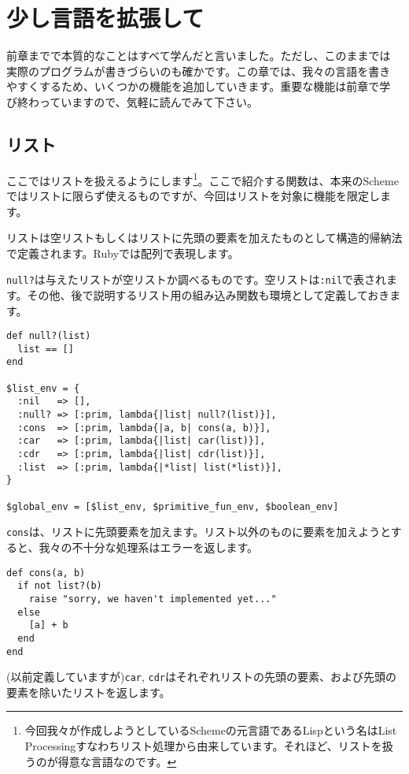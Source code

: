 \chapter{少し言語を拡張して\hspace{-3mm}}\label{chap:extend}
前章までで本質的なことはすべて学んだと言いました。ただし、このままでは
実際のプログラムが書きづらいのも確かです。この章では、我々の言語を書き
やすくするため、いくつかの機能を追加していきます。重要な機能は前章で学
び終わっていますので、気軽に読んでみて下さい。

\section{リスト}\label{sec:list}

ここではリストを扱えるようにします\footnote{今回我々が作成しようとしているSchemeの元言語であるLispという名はList Processingすなわちリスト処理から由来しています。それほど、リストを扱うのが得意な言語なのです。}。ここで紹介する関数は、本来のSchemeではリストに限らず使えるものですが、今回はリストを対象に機能を限定します。

リストは空リストもしくはリストに先頭の要素を加えたものとして構造的帰納法で定義されます。Rubyでは配列で表現します。

{\tt null?}は与えたリストが空リストか調べるものです。空リストは{\tt :nil}で表されます。その他、後で説明するリスト用の組み込み関数も環境として定義しておきます。

\begin{lstlisting}
def null?(list)
  list == []
end

$list_env = {
  :nil   => [],
  :null? => [:prim, lambda{|list| null?(list)}],
  :cons  => [:prim, lambda{|a, b| cons(a, b)}],
  :car   => [:prim, lambda{|list| car(list)}],
  :cdr   => [:prim, lambda{|list| cdr(list)}],
  :list  => [:prim, lambda{|*list| list(*list)}],
}

$global_env = [$list_env, $primitive_fun_env, $boolean_env]
\end{lstlisting}

{\tt cons}は、リストに先頭要素を加えます。リスト以外のものに要素を加えようとすると、我々の不十分な処理系はエラーを返します。

\begin{lstlisting}
def cons(a, b)
  if not list?(b)
    raise "sorry, we haven't implemented yet..."
  else
    [a] + b
  end
end
\end{lstlisting}

(以前定義していますが){\tt car}, {\tt cdr}はそれぞれリストの先頭の要素、および先頭の要素を除いたリストを返します。

